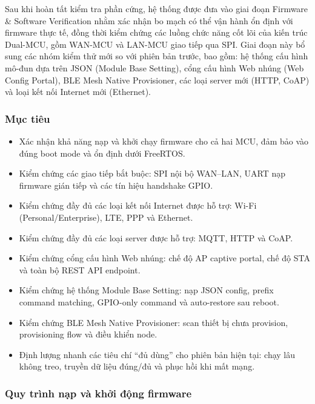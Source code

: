     Sau khi hoàn tất kiểm tra phần cứng, hệ thống được đưa vào giai đoạn Firmware \& Software Verification nhằm xác nhận bo mạch có thể vận hành ổn định với firmware thực tế, đồng thời kiểm chứng các luồng chức năng cốt lõi của kiến trúc Dual-MCU, gồm WAN-MCU và LAN-MCU giao tiếp qua SPI. Giai đoạn này bổ sung các nhóm kiểm thử mới so với phiên bản trước, bao gồm: hệ thống cấu hình mô-đun dựa trên JSON (Module Base Setting), cổng cấu hình Web nhúng (Web Config Portal), BLE Mesh Native Provisioner, các loại server mới (HTTP, CoAP) và loại kết nối Internet mới (Ethernet).
    
        \subsubsection{Mục tiêu}
        
        \begin{itemize}
            \item Xác nhận khả năng nạp và khởi chạy firmware cho cả hai MCU, đảm bảo vào đúng boot mode và ổn định dưới FreeRTOS.
            \item Kiểm chứng các giao tiếp bắt buộc: SPI nội bộ WAN--LAN, UART nạp firmware gián tiếp và các tín hiệu handshake GPIO.
            \item Kiểm chứng đầy đủ các loại kết nối Internet được hỗ trợ: Wi-Fi (Personal/Enterprise), LTE, PPP và Ethernet.
            \item Kiểm chứng đầy đủ các loại server được hỗ trợ: MQTT, HTTP và CoAP.
            \item Kiểm chứng cổng cấu hình Web nhúng: chế độ AP captive portal, chế độ STA và toàn bộ REST API endpoint.
            \item Kiểm chứng hệ thống Module Base Setting: nạp JSON config, prefix command matching, GPIO-only command và auto-restore sau reboot.
            \item Kiểm chứng BLE Mesh Native Provisioner: scan thiết bị chưa provision, provisioning flow và điều khiển node.
            \item Định lượng nhanh các tiêu chí ``đủ dùng'' cho phiên bản hiện tại: chạy lâu không treo, truyền dữ liệu đúng/đủ và phục hồi khi mất mạng.
        \end{itemize}
        
        \subsubsection{Quy trình nạp và khởi động firmware}
        
